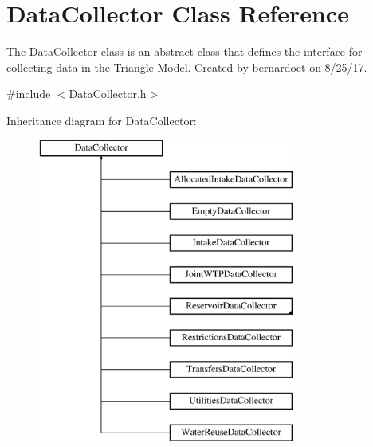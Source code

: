 \hypertarget{classDataCollector}{}\section{Data\+Collector Class Reference}
\label{classDataCollector}


The {\ttfamily \mbox{\hyperlink{classDataCollector}{Data\+Collector}}} class is an abstract class that defines the interface for collecting data in the \mbox{\hyperlink{classTriangle}{Triangle}} Model. Created by bernardoct on 8/25/17.  




{\ttfamily \#include $<$Data\+Collector.\+h$>$}

Inheritance diagram for Data\+Collector\+:\begin{figure}[H]
\begin{center}
\leavevmode
\includegraphics[height=10.000000cm]{classDataCollector}
\end{center}
\end{figure}
